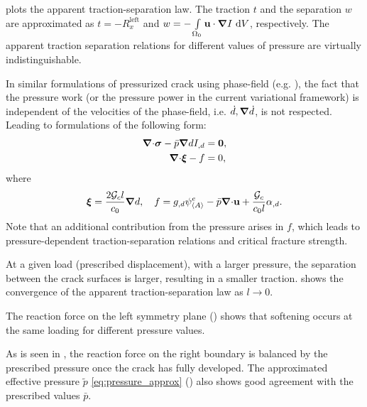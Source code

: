  plots the apparent traction-separation law. The traction $t$ and the separation $w$ are approximated as $t = -R_x^\text{left}$ and $w = - \int\limits_{\Omega_0} \textbf{u} \cdot \boldsymbol{\nabla} I \text{ d}V$, respectively. The apparent traction separation relations for different values of pressure are virtually indistinguishable.
\begin{remark}
  In similar formulations of pressurized crack using phase-field (e.g. \cite{CHUKWUDOZIE2019957,Mikeli__2015,WILSON2016264}), the fact that the pressure work (or the pressure power in the current variational framework) is independent of the velocities of the phase-field, i.e. $\dot{d}, \boldsymbol{\nabla} \dot{d}$, is not respected. Leading to formulations of the following form:
  \begin{subequations}
    \begin{align}
      {\boldsymbol{\nabla}\cdot} \boldsymbol{\sigma} - \bar{p} \boldsymbol{\nabla} d I_{,d} & = \boldsymbol{0}, \\
      {\boldsymbol{\nabla} \cdot} \boldsymbol{\xi} - f                     & = 0,      
    \end{align}
  \end{subequations}
  where
  \begin{align}
    \boldsymbol{\xi} = \dfrac{2{\mathcal{G}_c} l}{c_0} \boldsymbol{\nabla} d, \quad f = g_{,d}\psi^e_{\left< A \right>} - \bar{p}{\boldsymbol{\nabla} \cdot}\textbf{u} + \dfrac{{\mathcal{G}_c}}{c_0l}\alpha_{,d}.
  \end{align}
  Note that an additional contribution from the pressure arises in $f$, which leads to pressure-dependent traction-separation relations and critical fracture strength.
\end{remark}
At a given load (prescribed displacement), with a larger pressure, the separation between the crack surfaces is larger, resulting in a smaller traction.  shows the convergence of the apparent traction-separation law as $l \to 0$.



The reaction force on the left symmetry plane () shows that softening occurs at the same loading for different pressure values.

As is seen in , the reaction force on the right boundary is balanced by the prescribed pressure once the crack has fully developed.
The approximated effective pressure $\widetilde{p}$ \eqref{eq:pressure_approx} () also shows good agreement with the prescribed values $\bar{p}$.

